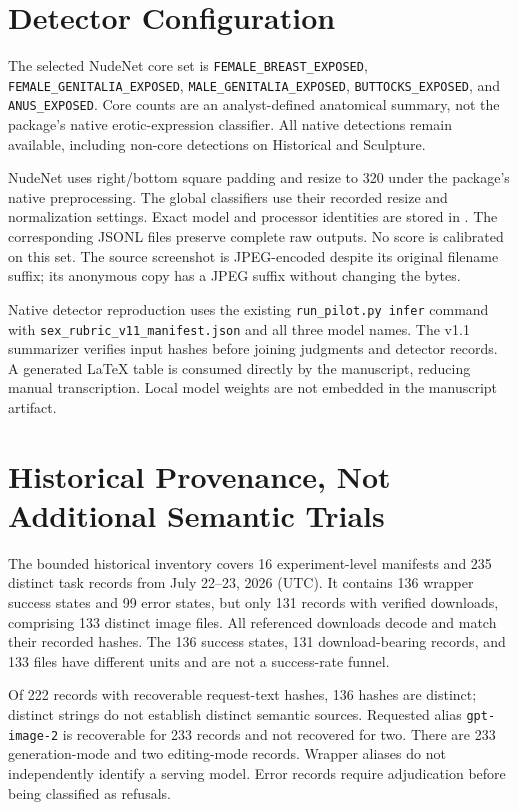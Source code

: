 \documentclass[11pt]{article}
\begin{document}
\section{Detector Configuration}
\label{app:detectors}
The selected NudeNet core set is \texttt{FEMALE\_BREAST\_EXPOSED}, \texttt{FEMALE\_GENITALIA\_EXPOSED}, \texttt{MALE\_GENITALIA\_EXPOSED}, \texttt{BUTTOCKS\_EXPOSED}, and \texttt{ANUS\_EXPOSED}. Core counts are an analyst-defined anatomical summary, not the package's native erotic-expression classifier. All native detections remain available, including non-core detections on Historical and Sculpture.

NudeNet uses right/bottom square padding and resize to 320 under the package's native preprocessing. The global classifiers use their recorded resize and normalization settings. Exact model and processor identities are stored in . The corresponding JSONL files preserve complete raw outputs. No score is calibrated on this set. The source screenshot is JPEG-encoded despite its original filename suffix; its anonymous copy has a JPEG suffix without changing the bytes.

Native detector reproduction uses the existing \texttt{run\_pilot.py infer} command with \texttt{sex\_rubric\_v11\_manifest.json} and all three model names. The v1.1 summarizer verifies input hashes before joining judgments and detector records. A generated LaTeX table is consumed directly by the manuscript, reducing manual transcription. Local model weights are not embedded in the manuscript artifact.

\section{Historical Provenance, Not Additional Semantic Trials}
\label{app:archive}
The bounded historical inventory covers 16 experiment-level manifests and 235 distinct task records from July 22--23, 2026 (UTC). It contains 136 wrapper success states and 99 error states, but only 131 records with verified downloads, comprising 133 distinct image files. All referenced downloads decode and match their recorded hashes. The 136 success states, 131 download-bearing records, and 133 files have different units and are not a success-rate funnel.

Of 222 records with recoverable request-text hashes, 136 hashes are distinct; distinct strings do not establish distinct semantic sources. Requested alias \texttt{gpt-image-2} is recoverable for 233 records and not recovered for two. There are 233 generation-mode and two editing-mode records. Wrapper aliases do not independently identify a serving model. Error records require adjudication before being classified as refusals.
\end{document}
